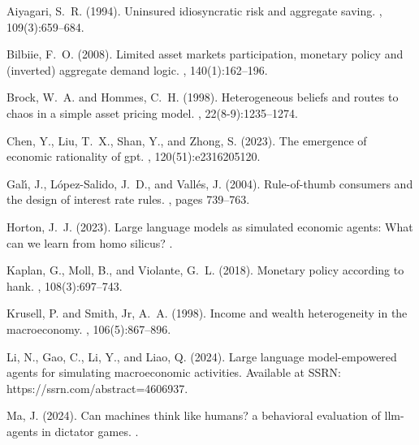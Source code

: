 \begin{thebibliography}{}

Aiyagari, S.~R. (1994).
\newblock Uninsured idiosyncratic risk and aggregate saving.
, 109(3):659--684.

Bilbiie, F.~O. (2008).
\newblock Limited asset markets participation, monetary policy and (inverted) aggregate demand logic.
, 140(1):162--196.

Brock, W.~A. and Hommes, C.~H. (1998).
\newblock Heterogeneous beliefs and routes to chaos in a simple asset pricing model.
, 22(8-9):1235--1274.

Chen, Y., Liu, T.~X., Shan, Y., and Zhong, S. (2023).
\newblock The emergence of economic rationality of gpt.
, 120(51):e2316205120.

Gal{\'\i}, J., L{\'o}pez-Salido, J.~D., and Vall{\'e}s, J. (2004).
\newblock Rule-of-thumb consumers and the design of interest rate rules.
, pages 739--763.

Horton, J.~J. (2023).
\newblock Large language models as simulated economic agents: What can we learn from homo silicus?
.

Kaplan, G., Moll, B., and Violante, G.~L. (2018).
\newblock Monetary policy according to hank.
, 108(3):697--743.

Krusell, P. and Smith, Jr, A.~A. (1998).
\newblock Income and wealth heterogeneity in the macroeconomy.
, 106(5):867--896.

Li, N., Gao, C., Li, Y., and Liao, Q. (2024).
\newblock Large language model-empowered agents for simulating macroeconomic activities.
\newblock Available at SSRN: https://ssrn.com/abstract=4606937.

Ma, J. (2024).
\newblock Can machines think like humans? a behavioral evaluation of llm-agents in dictator games.
.


\end{thebibliography}
